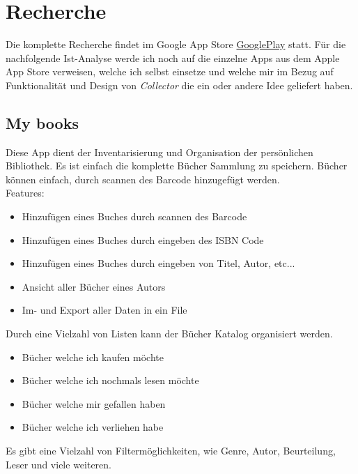 \chapter{Recherche}

Die komplette Recherche findet im Google App Store \href{https://play.google.com/store/apps}{GooglePlay} statt. Für die nachfolgende Ist-Analyse werde ich noch auf die einzelne Apps aus dem Apple App Store verweisen, welche ich selbst einsetze und welche mir im Bezug auf Funktionalität und Design von \emph{Collector} die ein oder andere Idee geliefert haben.

\section{My books}

Diese App dient der Inventarisierung und Organisation der persönlichen Bibliothek. Es ist einfach die komplette Bücher Sammlung zu speichern. Bücher können einfach, durch scannen des Barcode hinzugefügt werden.\\

Features:
\begin{itemize}
	\item Hinzufügen eines Buches durch scannen des Barcode
	\item Hinzufügen eines Buches durch eingeben des ISBN Code
	\item Hinzufügen eines Buches durch eingeben von Titel, Autor, etc...
	\item Ansicht aller Bücher eines Autors
	\item Im- und Export aller Daten in ein File
\end{itemize}

Durch eine Vielzahl von Listen kann der Bücher Katalog organisiert werden.
\begin{itemize}
	\item Bücher welche ich kaufen möchte
	\item Bücher welche ich nochmals lesen möchte
	\item Bücher welche mir gefallen haben
	\item Bücher welche ich verliehen habe
\end{itemize} 

Es gibt eine Vielzahl von Filtermöglichkeiten, wie Genre, Autor, Beurteilung, Leser und viele weiteren.